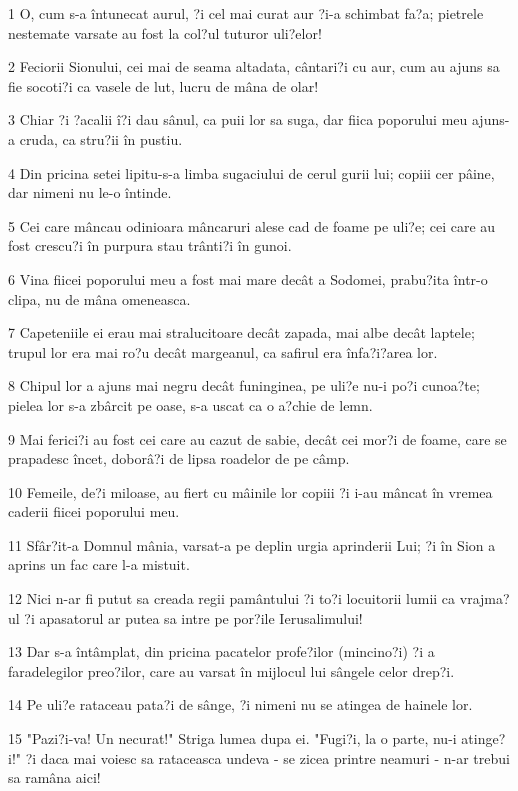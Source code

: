 \par 1 O, cum s-a întunecat aurul, ?i cel mai curat aur ?i-a schimbat fa?a; pietrele nestemate varsate au fost la col?ul tuturor uli?elor!
\par 2 Feciorii Sionului, cei mai de seama altadata, cântari?i cu aur, cum au ajuns sa fie socoti?i ca vasele de lut, lucru de mâna de olar!
\par 3 Chiar ?i ?acalii î?i dau sânul, ca puii lor sa suga, dar fiica poporului meu ajuns-a cruda, ca stru?ii în pustiu.
\par 4 Din pricina setei lipitu-s-a limba sugaciului de cerul gurii lui; copiii cer pâine, dar nimeni nu le-o întinde.
\par 5 Cei care mâncau odinioara mâncaruri alese cad de foame pe uli?e; cei care au fost crescu?i în purpura stau trânti?i în gunoi.
\par 6 Vina fiicei poporului meu a fost mai mare decât a Sodomei, prabu?ita într-o clipa, nu de mâna omeneasca.
\par 7 Capeteniile ei erau mai stralucitoare decât zapada, mai albe decât laptele; trupul lor era mai ro?u decât margeanul, ca safirul era înfa?i?area lor.
\par 8 Chipul lor a ajuns mai negru decât funinginea, pe uli?e nu-i po?i cunoa?te; pielea lor s-a zbârcit pe oase, s-a uscat ca o a?chie de lemn.
\par 9 Mai ferici?i au fost cei care au cazut de sabie, decât cei mor?i de foame, care se prapadesc încet, doborâ?i de lipsa roadelor de pe câmp.
\par 10 Femeile, de?i miloase, au fiert cu mâinile lor copiii ?i i-au mâncat în vremea caderii fiicei poporului meu.
\par 11 Sfâr?it-a Domnul mânia, varsat-a pe deplin urgia aprinderii Lui; ?i în Sion a aprins un fac care l-a mistuit.
\par 12 Nici n-ar fi putut sa creada regii pamântului ?i to?i locuitorii lumii ca vrajma?ul ?i apasatorul ar putea sa intre pe por?ile Ierusalimului!
\par 13 Dar s-a întâmplat, din pricina pacatelor profe?ilor (mincino?i) ?i a faradelegilor preo?ilor, care au varsat în mijlocul lui sângele celor drep?i.
\par 14 Pe uli?e rataceau pata?i de sânge, ?i nimeni nu se atingea de hainele lor.
\par 15 "Pazi?i-va! Un necurat!" Striga lumea dupa ei. "Fugi?i, la o parte, nu-i atinge?i!" ?i daca mai voiesc sa rataceasca undeva - se zicea printre neamuri - n-ar trebui sa ramâna aici!
